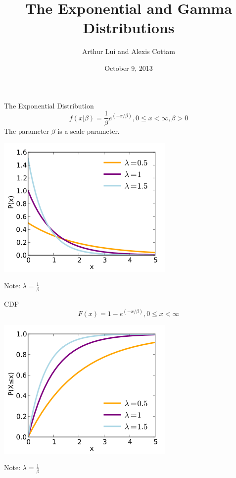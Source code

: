 \documentclass{beamer}
\begin{document}
\title{The Exponential and Gamma Distributions}
\author{Arthur Lui and Alexis Cottam}
\date{October 9, 2013}

\def\wl{\par \vspace{\baselineskip}}

\begin{frame}
\titlepage
\end{frame}

\begin{frame}{The Exponential Distribution}
\[
  f(x \vert \beta) = \frac{1}{\beta}e^{(-x/\beta)}, 0 \leq x < \infty, \beta > 0
\] 
The parameter $\beta$ is a scale parameter.
\begin{center}
\includegraphics[scale=.50]{exppdf.png}
\end{center}
Note: $\lambda = \frac{1}{\beta}$
\end{frame}

\begin{frame}{CDF}
\[
  F(x) = 1 - e^{(-x/\beta)} , 0 \leq x < \infty
\]
\begin{center}
\includegraphics[scale=.50]{expcdf.png}
\end{center}
Note: $\lambda = \frac{1}{\beta}$

\end{frame}
\end{document}
